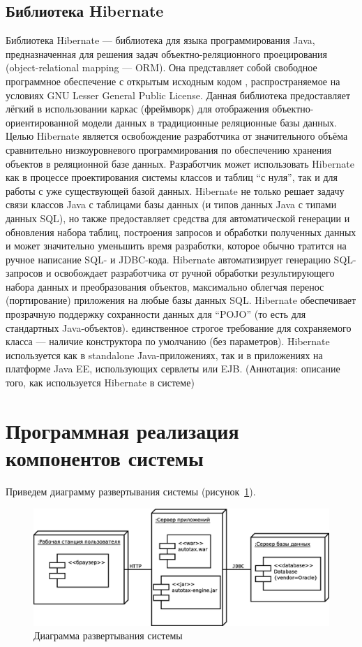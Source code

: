 \documentclass[14pt,a4paper]{reportmod}
\begin{document}
\subsection{Библиотека Hibernate}
Библиотека Hibernate — библиотека для языка программирования Java, предназначенная для решения задач объектно-реляционного проецирования (object-relational mapping — ORM). Она представляет собой свободное программное обеспечение с открытым исходным кодом , распространяемое на условиях GNU Lesser General Public License. Данная библиотека предоставляет лёгкий в использовании каркас (фреймворк) для отображения объектно-ориентированной модели данных в традиционные реляционные базы данных.
Целью Hibernate является освобождение разработчика от значительного объёма сравнительно низкоуровневого программирования по обеспечению хранения объектов в реляционной базе данных. Разработчик может использовать Hibernate как в процессе проектирования системы классов и таблиц ``с нуля'', так и для работы с уже существующей базой данных.
Hibernate не только решает задачу связи классов Java с таблицами базы данных (и типов данных Java с типами данных SQL), но также предоставляет средства для автоматической генерации и обновления набора таблиц, построения запросов и обработки полученных данных и может значительно уменьшить время разработки, которое обычно тратится на ручное написание SQL- и JDBC-кода. Hibernate автоматизирует генерацию SQL-запросов и освобождает разработчика от ручной обработки результирующего набора данных и преобразования объектов, максимально облегчая перенос (портирование) приложения на любые базы данных SQL.
Hibernate обеспечивает прозрачную поддержку сохранности данных  для ``POJO'' (то есть для стандартных Java-объектов). единственное строгое требование для сохраняемого класса — наличие конструктора по умолчанию (без параметров).
Hibernate используется как в standalone Java-приложениях, так и в приложениях на платформе Java EE, использующих сервлеты или EJB.
(Аннотация: описание того, как используется Hibernate в системе)

\section{Программная реализация компонентов системы}

Приведем диаграмму развертывания системы (рисунок~\ref{pic:deployment}).

\begin{figure}
  \centering
  \includegraphics[scale=0.4]{uml/deployment}
  \caption{Диаграмма развертывания системы}
  \label{pic:deployment}
\end{figure}
\end{document}
